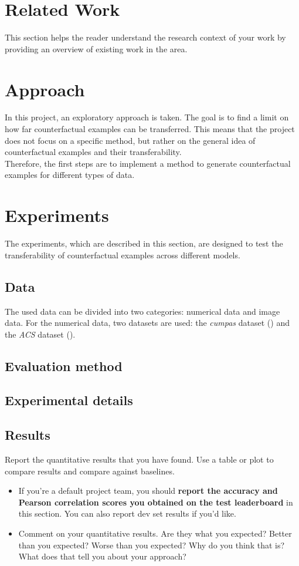 \documentclass{article}
\begin{document}
\section{Related Work}
This section helps the reader understand the research context of your work by providing an overview of existing work in the area. \cite{rajpurkar2018know3}

\section{Approach}
In this project, an exploratory approach is taken. The goal is to find a limit on how far counterfactual examples can be transferred. This means that the project does not focus on a specific method, but rather on the general idea of counterfactual examples and their transferability. \\
Therefore, the first steps are to implement a method to generate counterfactual examples for different types of data.
\section{Experiments}
The experiments, which are described in this section, are designed to test the transferability of counterfactual examples across different models. 

\subsection{Data}
The used data can be divided into two categories: numerical data and image data. For the numerical data, two datasets are used: the \textit{cumpas} dataset (\cite{compas_dataset}) and the \textit{ACS} dataset (\cite{acs_dataset}). 

\subsection{Evaluation method}

\subsection{Experimental details}

\subsection{Results}
Report the quantitative results that you have found. Use a table or plot to compare results and compare against baselines.
\begin{itemize}
    \item If you're a default project team, you should \textbf{report the accuracy and Pearson correlation scores you obtained on the test leaderboard} in this section. You can also report dev set results if you'd like. 
    \item Comment on your quantitative results. Are they what you expected? Better than you expected? Worse than you expected? Why do you think that is? What does that tell you about your approach?
\end{itemize}
\end{document}
